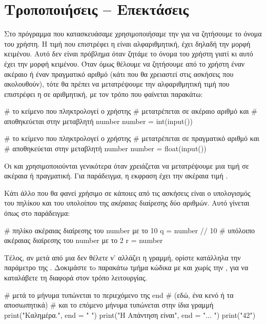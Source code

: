 \documentclass[a4paper,11pt,oneside]{book}
\begin{document}
\section{Τροποποιήσεις -- Επεκτάσεις}

Στο πρόγραμμα που κατασκευάσαμε χρησιμοποιήσαμε την  για να ζητήσουμε το όνομα του χρήστη. Η τιμή που επιστρέφει η  είναι αλφαριθμητική, έχει δηλαδή την μορφή κειμένου. Αυτό δεν είναι πρόβλημα όταν ζητάμε το όνομα του χρήστη γιατί κι αυτό έχει την μορφή κειμένου. Όταν όμως θέλουμε να ζητήσουμε από το χρήστη έναν ακέραιο ή έναν πραγματικό αριθμό (κάτι που θα χρειαστεί στις ασκήσεις που ακολουθούν), τότε θα πρέπει να μετατρέψουμε την αλφαριθμητική τιμή που επιστρέφει η  σε αριθμητική, με τον τρόπο που φαίνεται παρακάτω:

\begin{pycode}
# το κείμενο που πληκτρολογεί ο χρήστης
# μετατρέπεται σε ακέραιο αριθμό και 
# αποθηκεύεται στην μεταβλητή number
number = int(input())
\end{pycode}

\begin{pycode}
# το κείμενο που πληκτρολογεί ο χρήστης
# μετατρέπεται σε πραγματικό αριθμό και 
# αποθηκεύεται στην μεταβλητή number
number = float(input())
\end{pycode}

Οι  και  χρησιμοποιούνται γενικότερα όταν χρειάζεται να μετατρέψουμε μια τιμή σε ακέραια ή πραγματική. Για παράδειγμα, η εκφραση  έχει την ακέραια τιμή .

Κάτι άλλο που θα φανεί χρήσιμο σε κάποιες από τις ασκήσεις είναι ο υπολογισμός του πηλίκου και του υπολοίπου της \emph{ακέραιας} διαίρεσης δύο αριθμών. Αυτό γίνεται όπως στο παράδειγμα:

\begin{pycode}
# πηλίκο ακέραιας διαίρεσης του number με το 10
q = number // 10
# υπόλοιπο ακέραιας διαίρεσης του number με το 2
r = number %
\end{pycode}

Τέλος, αν μετά από μια  δεν θέλετε ν' αλλάζει η γραμμή, ορίστε κατάλληλα την παράμετρο  της . Δοκιμάστε τo παρακάτω τμήμα κώδικα με και χωρίς την , για να καταλάβετε τη διαφορά στον τρόπο λειτουργίας.

\begin{pycode}
# μετά το μήνυμα τυπώνεται το περιεχόμενο της end
# (εδώ, ένα κενό ή τα αποσιωπητικά)
# και το επόμενο μήνυμα τυπώνεται στην ίδια γραμμή
print("Καλημέρα.", end = " ")
print("Η Απάντηση είναι", end = "... ")
print("42")
\end{pycode}
\end{document}
